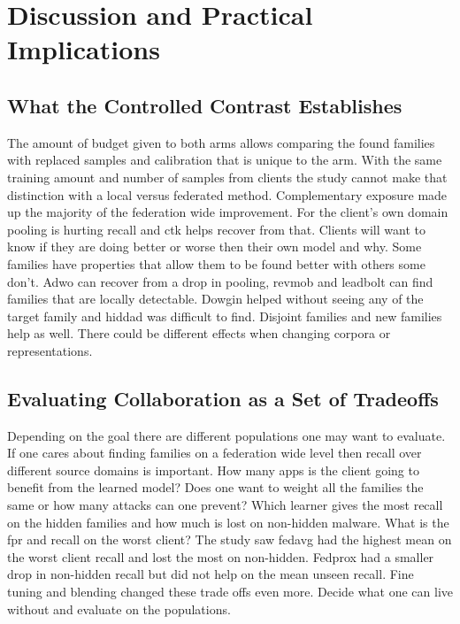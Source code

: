 \documentclass[12pt,letterpaper]{article}
\begin{document}
\section*{Discussion and Practical Implications} 

\subsection*{What the Controlled Contrast Establishes} 

The amount of budget given to both arms allows comparing the found families with replaced samples and calibration that is unique to the arm. With the same training amount and number of samples from clients the study cannot make that distinction with a local versus federated method. Complementary exposure made up the majority of the federation wide improvement. For the client's own domain pooling is hurting recall and ctk helps recover from that. Clients will want to know if they are doing better or worse then their own model and why. Some families have properties that allow them to be found better with others some don't. Adwo can recover from a drop in pooling, revmob and leadbolt can find families that are locally detectable. Dowgin helped without seeing any of the target family and hiddad was difficult to find. Disjoint families and new families help as well. There could be different effects when changing corpora or representations.

\subsection*{Evaluating Collaboration as a Set of Tradeoffs}

Depending on the goal there are different populations one may want to evaluate. If one cares about finding families on a federation wide level then recall over different source domains is important. How many apps is the client going to benefit from the learned model? Does one want to weight all the families the same or how many attacks can one prevent? Which learner gives the most recall on the hidden families and how much is lost on non-hidden malware. What is the fpr and recall on the worst client? The study saw fedavg had the highest mean on the worst client recall and lost the most on non-hidden. Fedprox had a smaller drop in non-hidden recall but did not help on the mean unseen recall. Fine tuning and blending changed these trade offs even more. Decide what one can live without and evaluate on the populations.
\end{document}
